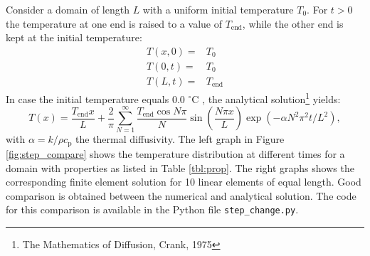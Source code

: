 \documentclass[10pt, a4paper, twoside, headinclude,footinclude, BCOR5mm]{scrartcl}
\begin{document}
Consider a domain of length \(L\) with a uniform initial temperature \(T_0\). For \(t>0\) the temperature at one end is raised to a value of \(T_{\text{end}}\), while the other end is kept at the initial temperature:
\begin{eqnarray*}
  T(x, 0) =& T_0\\
  T(0, t) =& T_0\\
  T(L, t) =& T_{\text{end}}
\end{eqnarray*}
In case the initial temperature equals 0.0 \(^{\circ}\)C , the analytical solution\footnote{The Mathematics of Diffusion, Crank, 1975} yields:
\begin{equation}
T(x) = \frac{T_{\text{end}}x}{L} + \frac{2}{\pi}
       \sum_{N=1}^{\infty} \frac{T_{\text{end}} \cos N\pi}{N}
       \sin\left(\frac{N\pi x}{L}\right)
       \exp\left(-\alpha N^2 \pi^2 t / L^2 \right),
\end{equation}
with \(\alpha = k/\rho c_{\text{p}}\) the thermal diffusivity. The left graph in Figure \ref{fig:step_compare} shows the temperature distribution at different times for a domain with properties as listed in Table \ref{tbl:prop}. The right graphs shows the corresponding finite element solution for 10 linear elements of equal length. Good comparison is obtained between the numerical and analytical solution. The code for this comparison is available in the Python file \texttt{step\_change.py}.
\end{document}
